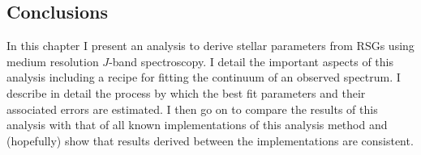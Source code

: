 \documentclass[12pt]{article}
\begin{document}
\subsection{Conclusions} %
\label{sub:conclusions}
In this chapter I present an analysis to derive stellar parameters from RSGs using medium resolution $J$-band spectroscopy.
I detail the important aspects of this analysis including a recipe for fitting the continuum of an observed spectrum.
I describe in detail the process by which the best fit parameters and their associated errors are estimated.
I then go on to compare the results of this analysis with that of all known implementations of this analysis method and (hopefully) show that results derived between the implementations are consistent.

{}

\end{document}
